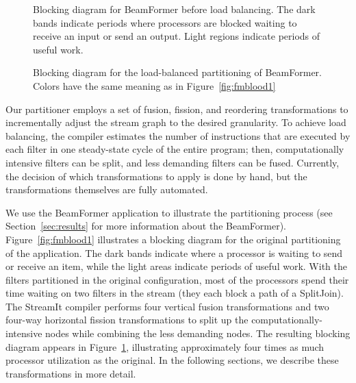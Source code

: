 \begin{figure}[t]
\vspace{-6pt}
\begin{minipage}{3.1in}
\vspace{-12pt}
\caption{\protect\small Blocking diagram for BeamFormer before load
balancing.  The dark bands indicate periods where processors are
blocked waiting to receive an input or send an output.  Light regions
indicate periods of useful work.
\protect\label{fig:fmblood1}}
\end{minipage}
\hspace{0.3in}
\vspace{-12pt}
\begin{minipage}{3.1in}
\caption{\protect\small Blocking diagram for the load-balanced
partitioning of BeamFormer.  Colors have the same meaning as in Figure~\ref{fig:fmblood1}
\protect\label{fig:fmblood2}}
\end{minipage}
\vspace{-6pt}
\end{figure}

Our partitioner employs a set of fusion, fission, and reordering
transformations to incrementally adjust the stream graph to the
desired granularity.  To achieve load balancing, the compiler
estimates the number of instructions that are executed by each filter
in one steady-state cycle of the entire program; then, computationally
intensive filters can be split, and less demanding filters can be
fused.  Currently, the decision of which transformations to apply is
done by hand, but the transformations themselves are fully automated.

We use the BeamFormer application \cite{pca} to illustrate the
partitioning process (see Section~\ref{sec:results} for more
information about the BeamFormer).  Figure~\ref{fig:fmblood1}
illustrates a blocking diagram for the original partitioning of the
application.  The dark bands indicate where a processor is waiting to
send or receive an item, while the light areas indicate periods of
useful work.  With the filters partitioned in the original
configuration, most of the processors spend their time waiting on two
filters in the stream (they each block a path of a SplitJoin).  The
StreamIt compiler performs four vertical fusion transformations and
two four-way horizontal fission transformations to split up the
computationally-intensive nodes while combining the less demanding
nodes.  The resulting blocking diagram appears in
Figure~\ref{fig:fmblood2}, illustrating approximately four times as
much processor utilization as the original.  In the following
sections, we describe these transformations in more detail.

